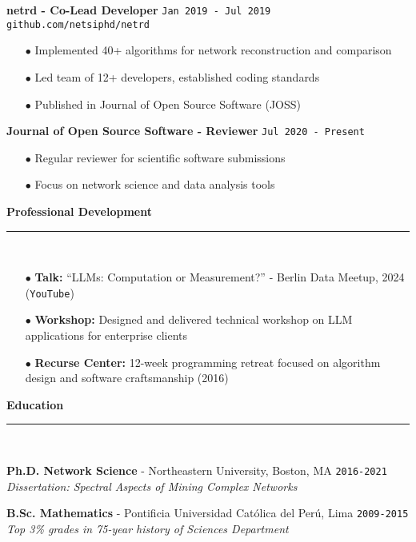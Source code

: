 \documentclass[11pt,a4paper]{article}
\newcommand{\sectiondivider}{%
    \vspace{2pt}\\%
    {\color{verdigris}\rule{30pt}{2pt}}\\%
    \vspace{8pt}%
}
\newcommand{\verdigrisbullet}{{\color{verdigris}$\bullet$}\space}
\newcommand{\jobduration}[1]{%
    \textcolor{mediumgray}{\texttt{\small #1}}%
}
\newcommand{\cvsectioncustom}[1]{%
    \vspace{12pt}%
    {\Large\color{navy}\textbf{#1}}%
    \sectiondivider%
}
\begin{document}
\vspace{6pt}

\textbf{\large\color{navy}netrd - Co-Lead Developer} \hfill \jobduration{Jan 2019 - Jul 2019}\\
{\textcolor{verdigris}{\texttt{github.com/netsiphd/netrd}}}

\begin{itemize}[leftmargin=15pt,itemsep=3pt]
    \item[\verdigrisbullet] Implemented 40+ algorithms for network reconstruction and comparison
    \item[\verdigrisbullet] Led team of 12+ developers, established coding standards
    \item[\verdigrisbullet] Published in Journal of Open Source Software (JOSS)
\end{itemize}

\vspace{6pt}

\textbf{\large\color{navy}Journal of Open Source Software - Reviewer} \hfill \jobduration{Jul 2020 - Present}

\begin{itemize}[leftmargin=15pt,itemsep=3pt]
    \item[\verdigrisbullet] Regular reviewer for scientific software submissions
    \item[\verdigrisbullet] Focus on network science and data analysis tools
\end{itemize}

\cvsectioncustom{Professional Development}

\begin{itemize}[leftmargin=15pt,itemsep=3pt]
    \item[\verdigrisbullet] \textbf{Talk:} ``LLMs: Computation or Measurement?'' - Berlin Data Meetup, 2024 ({\textcolor{verdigris}{\texttt{YouTube}}})
    \item[\verdigrisbullet] \textbf{Workshop:} Designed and delivered technical workshop on LLM applications for enterprise clients
    \item[\verdigrisbullet] \textbf{Recurse Center:} 12-week programming retreat focused on algorithm design and software craftsmanship (2016)
\end{itemize}

\cvsectioncustom{Education}

\textbf{\large\color{navy}Ph.D. Network Science} - Northeastern University, Boston, MA \hfill \jobduration{2016-2021}\\
\textit{Dissertation: Spectral Aspects of Mining Complex Networks}

\vspace{6pt}

\textbf{\large\color{navy}B.Sc. Mathematics} - Pontificia Universidad Católica del Perú, Lima \hfill \jobduration{2009-2015}\\
\textit{Top 3\% grades in 75-year history of Sciences Department}
\end{document}
